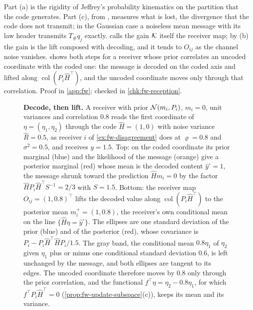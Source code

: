 Part (a) is the rigidity of Jeffrey's probability kinematics \citep{jeffrey1965logic} on the partition that the code generates. Part (c), from \citet{dennis2026magent}, measures what is lost, the divergence that the code does not transmit; in the Gaussian case a noiseless mean message with its law header transmits $T_\#q_j$ exactly.  calls the gain $\mathcal{K}$ itself the receiver map; by (b) the gain is the lift composed with decoding, and it tends to $O_{ij}$ as the channel noise vanishes.  shows both steps for a receiver whose prior correlates an uncoded coordinate with the coded one: the message is decoded on the coded axis and lifted along $\operatorname{col}(P_i\hat H^\top)$, and the uncoded coordinate moves only through that correlation. Proof in \cref{app:fw}; checked in \cref{chk:fw-reception}.

\begin{figure}[t]
  \centering
  
  \caption{\textbf{Decode, then lift.} A receiver with prior $\mathcal{N}(m_i,P_i)$, $m_i=0$, unit variances and correlation $0.8$ reads the first coordinate of $\eta=(\eta_1,\eta_2)$ through the code $\hat H=(1,0)$ with noise variance $\hat R=0.5$, as receiver $i$ of \cref{ex:fw-disagreement} does at $\varrho=0.8$ and $\sigma^2=0.5$, and receives $y=1.5$. Top: on the coded coordinate its prior marginal (blue) and the likelihood of the message (orange) give a posterior marginal (red) whose mean is the decoded content $\hat y^\circ=1$, the message shrunk toward the prediction $\hat Hm_i=0$ by the factor $\hat HP_i\hat H^\top S^{-1}=2/3$ with $S=1.5$. Bottom: the receiver map $O_{ij}=(1,0.8)^\top$ lifts the decoded value along $\operatorname{col}(P_i\hat H^\top)$ to the posterior mean $m_i^+=(1,0.8)$, the receiver's own conditional mean on the line $\{\hat H\eta=\hat y^\circ\}$. The ellipses are one standard deviation of the prior (blue) and of the posterior (red), whose covariance is $P_i-P_i\hat H^\top\hat HP_i/1.5$. The gray band, the conditional mean $0.8\eta_1$ of $\eta_2$ given $\eta_1$ plus or minus one conditional standard deviation $0.6$, is left unchanged by the message, and both ellipses are tangent to its edges. The uncoded coordinate therefore moves by $0.8$ only through the prior correlation, and the functional $f^\top\eta=\eta_2-0.8\eta_1$, for which $f^\top P_i\hat H^\top=0$ (\cref{prop:fw-update-subspace}(c)), keeps its mean and its variance.}
  \label{fig:fw-lift}
\end{figure}

